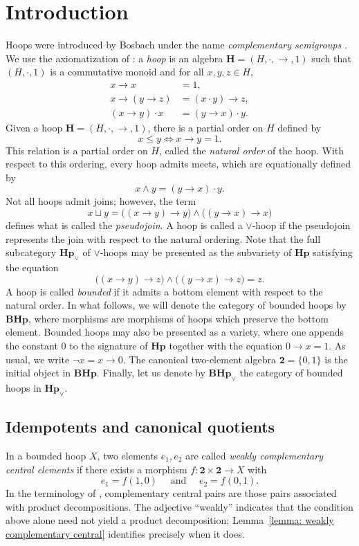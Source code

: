 \documentclass[11pt]{article}
\theoremstyle{pretty}
\theoremstyle{plainnote}
\renewcommand{\2}{\mathbf{2}}
\newcommand{\Hoop}{\mathbf{Hp}}
\newcommand{\BoundedHoop}{\mathbf{BHp}}
\begin{document}
\section{Introduction}
Hoops were introduced by Bosbach under the name \emph{complementary semigroups} \cite{Bosbach1969}. We use the axiomatization of \cite{BlokFerreirim2000StructureHoops}: a \emph{hoop} is an algebra $\mathbf{H}=(H,\cdot,\to,1)$ such that $(H,\cdot,1)$ is a commutative monoid and for all $x,y,z\in H$,
\begin{align*}
    x \to x &= 1,\\
      x \to (y \to z) &= (x\cdot y)\to z,\\
      (x\to y)\cdot x &= (y\to x)\cdot y.
    \end{align*}
Given a hoop $\mathbf{H}=(H,\cdot,\to,1)$, there is a partial order on $H$ defined by
\[
x \leqslant y \iff x \to y = 1.
\]
This relation is a partial order on $H$, called the \emph{natural order} of the hoop. With respect to this ordering, every hoop admits meets, which are equationally defined by
\[
x \wedge y = (y\to x)\cdot y.
\]
Not all hoops admit joins; however, the term 
\[
x \sqcup y = \big ((x \to y) \to y \big ) \wedge \big ((y \to x) \to x \big )
\]
defines what is called the \emph{pseudojoin}. A hoop is called a $\vee$-hoop if the pseudojoin represents the join with respect to the natural ordering. Note that the full subcategory $\Hoop_\vee$ of $\vee$-hoops may be presented as the subvariety of $\Hoop$ satisfying the equation
\[
\big ((x \to y) \to z \big ) \wedge \big ((y \to x) \to z \big ) = z.
\]
A hoop is called \emph{bounded} if it admits a bottom element with respect to the natural order. In what follows, we will denote the category of bounded hoops by $\BoundedHoop$, where morphisms are morphisms of hoops which preserve the bottom element. Bounded hoops may also be presented as a variety, where one appends the constant $0$ to the signature of $\Hoop$ together with the equation $0 \to x = 1$. As usual, we write $\neg x=x\to 0$. The canonical two-element algebra $\2 = \{0,1\}$ is the initial object in $\BoundedHoop$. Finally, let us denote by $\BoundedHoop_\vee$ the category of bounded hoops in $\Hoop_\vee$.

\subsection{Idempotents and canonical quotients}
In a bounded hoop $X$, two elements $e_1, e_2$ are called \emph{weakly complementary central elements}  if there exists a morphism $f:\2 \times \2 \to X$ with 
\[
e_1 = f(1,0) \quad \text{ and } \quad e_2 = f(0,1). 
\]
In the terminology of \cite{Botero2021}, complementary central pairs are
those pairs associated with product decompositions. The adjective
``weakly'' indicates that the condition above alone need not yield a
product decomposition; Lemma~\ref{lemma: weakly complementary central}
identifies precisely when it does.
\end{document}
